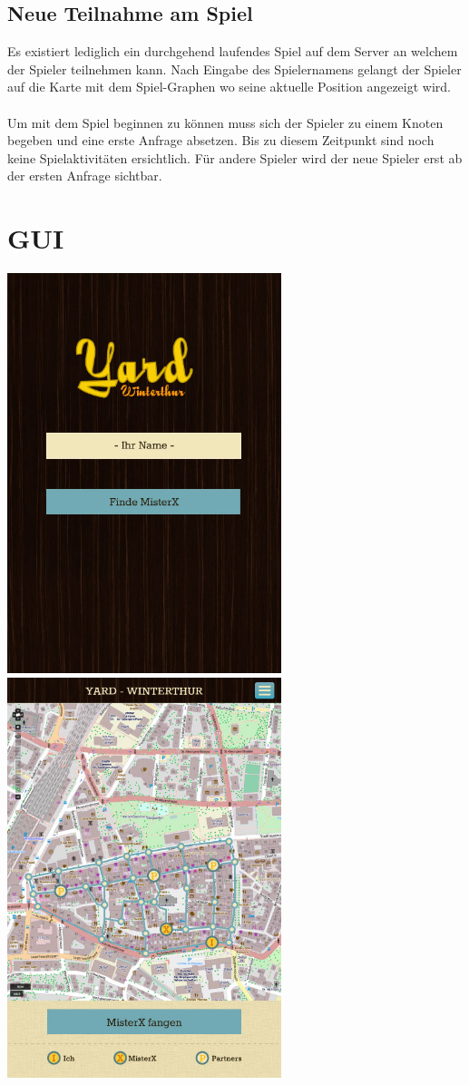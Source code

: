 \documentclass[11pt]{article}
\begin{document}
\subsection{Neue Teilnahme am Spiel}
Es existiert lediglich ein durchgehend laufendes Spiel auf dem Server an welchem der Spieler teilnehmen kann. 
Nach Eingabe des Spielernamens gelangt der Spieler auf die Karte mit dem Spiel-Graphen wo seine aktuelle Position angezeigt wird.
\\\\
Um mit dem Spiel beginnen zu können muss sich der Spieler zu einem Knoten begeben und eine erste Anfrage absetzen. Bis zu diesem Zeitpunkt sind noch keine Spielaktivitäten ersichtlich.
Für andere Spieler wird der neue Spieler erst ab der ersten Anfrage sichtbar.


\section{GUI}
\includegraphics[width=8cm]{Bilder/homeView.jpg}
\includegraphics[width=8cm]{Bilder/karteView.jpg}
\end{document}
